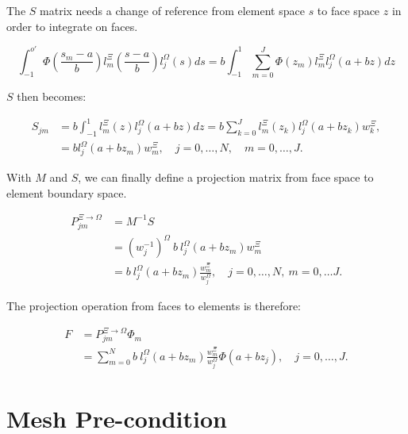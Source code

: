 \noindent
The \(S\) matrix needs a change of reference from element space \(s\) to face space \(z\) in order
to integrate on faces.

\begin{equation}
    \int_{-1}^{o'} \Phi(\frac{s_m -a}{b})l_m^\Xi(\frac{s -a}{b}) l_j^\Omega(s)ds
    = b\int_{-1}^{1}\sum_{m = 0}^{J} \Phi(z_m)l_m^{\Xi}l_j^{\Omega}(a + bz)dz
\end{equation}

\noindent
\(S\) then becomes: 

\begin{equation}
    \begin{aligned}
        S_{jm} &=  b\int_{-1}^{1}l_m^{\Xi}(z)l_j^{\Omega}(a + bz)dz
        = b\sum_{k = 0}^{J}l_m^{\Xi}(z_k)l_j^{\Omega}(a +b z_k)w_k^{\Xi}, \\
        &= b l_j^{\Omega}(a + bz_m)w_m^{\Xi}, \quad j = 0, \ldots, N, \quad m = 0, \ldots, J.
    \end{aligned}
\end{equation}

\noindent
With \(M\) and \(S\), we can finally define a projection matrix from face space to element boundary
space.

\begin{equation}
    \begin{aligned}
        P^{\Xi \rightarrow \Omega}_{jm} &= M^{-1}S \\
        &= {(w_j^{-1})}^{\Omega } \: b \: l_j^{\Omega }(a + bz_m)w_m^{\Xi}\\
        &= b \: l_j^{\Omega}(a + bz_m)\frac{w_m^{\Xi}}{w_j^{\Omega}}, \quad j = 0, \ldots, N, \: m = 0, \ldots J. 
    \end{aligned}
\end{equation} 

\noindent
The projection operation from faces to elements is therefore:

\begin{align} \label{projection_face_to_element}
    F &= P^{\Xi \rightarrow \Omega}_{jm} \Phi_m  \\
    &= \sum_{m = 0}^{N} b \: l_j^{\Omega}(a + bz_m)\frac{w_m^{\Xi}}{w_j^{\Omega}} \Phi (a + b z_j), \quad j = 0, \ldots, J.
\end{align}

\section{Mesh Pre-condition}\label{section:adaptive_mesh_refinement:pre_conditioning}

